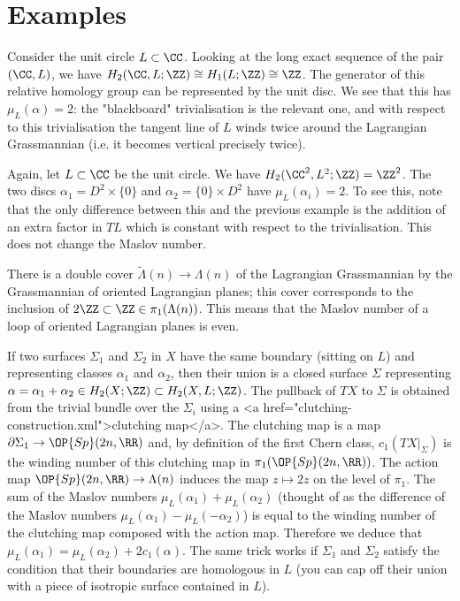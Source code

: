 \documentclass{article}
\begin{document}
\section{Examples}

\begin{Example}
  Consider the unit circle $L\subset\CC$. Looking at the long exact sequence of the pair $(\CC,L)$, we have $H_2(\CC,L;\ZZ)\cong H_1(L;\ZZ)\cong\ZZ$. The generator of this relative homology group can be represented by the unit disc. We see that this has $\mu_L(\alpha)=2$: the "blackboard" trivialisation is the relevant one, and with respect to this trivialisation the tangent line of $L$ winds twice around the Lagrangian Grassmannian (i.e. it becomes vertical precisely twice).
\end{Example}

\begin{Example}
  Again, let $L\subset\CC$ be the unit circle. We have $H_2(\CC^2,L^2;\ZZ)=\ZZ^2$. The two discs $\alpha_1=D^2\times\{0\}$ and $\alpha_2=\{0\}\times D^2$ have $\mu_L(\alpha_i)=2$. To see this, note that the only difference between this and the previous example is the addition of an extra factor in $TL$ which is constant with respect to the trivialisation. This does not change the Maslov number.
\end{Example}

\begin{Remark}[rmkdoublecover]
  There is a double cover $\tilde{\Lambda}(n)\to\Lambda(n)$ of the Lagrangian Grassmannian by the Grassmannian of oriented Lagrangian planes; this cover corresponds to the inclusion of $2\ZZ\subset\ZZ\in\pi_1(\Lambda(n))$. This means that the Maslov number of a loop of oriented Lagrangian planes is even.
\end{Remark}

\begin{Remark}[rmk2c1]
  If two surfaces $\Sigma_1$ and $\Sigma_2$ in $X$ have the same boundary (sitting on $L$) and representing classes $\alpha_1$ and $\alpha_2$, then their union is a closed surface $\Sigma$ representing $\alpha=\alpha_1+\alpha_2\in H_2(X;\ZZ)\subset H_2(X,L;\ZZ)$. The pullback of $TX$ to $\Sigma$ is obtained from the trivial bundle over the $\Sigma_i$ using a <a href="clutching-construction.xml">clutching map</a>. The clutching map is a map $\partial\Sigma_1\to\OP{Sp}(2n,\RR)$ and, by definition of the first Chern class, $c_1(TX|_\Sigma)$ is the winding number of this clutching map in $\pi_1(\OP{Sp}(2n,\RR))$. The action map $\OP{Sp}(2n,\RR)\to\Lambda(n)$ induces the map $z\mapsto 2z$ on the level of $\pi_1$. The sum of the Maslov numbers $\mu_L(\alpha_1)+\mu_L(\alpha_2)$ (thought of as the difference of the Maslov numbers $\mu_L(\alpha_1)-\mu_L(-\alpha_2)$) is equal to the winding number of the clutching map composed with the action map. Therefore we deduce that $\mu_L(\alpha_1)=\mu_L(\alpha_2)+2c_1(\alpha)$. The same trick works if $\Sigma_1$ and $\Sigma_2$ satisfy the condition that their boundaries are homologous in $L$ (you can cap off their union with a piece of isotropic surface contained in $L$).
\end{Remark}
\end{document}
